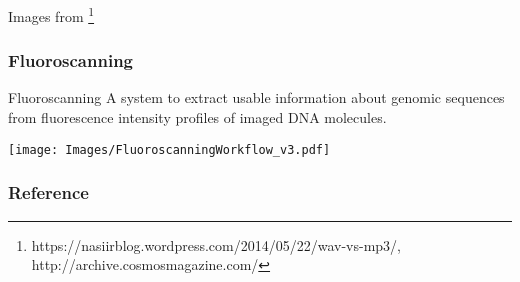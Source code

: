 \documentclass[10pt,dvipsnames,table]{beamer}
\begin{document}
\begin{frame}
\begin{columns}[t]
\begin{column}{0.5\textwidth}
\end{column}
\end{columns}
{\tiny{Images from \footnote{\tiny{https://nasiirblog.wordpress.com/2014/05/22/wav-vs-mp3/, http://archive.cosmosmagazine.com/}} }}
\end{frame}

\begin{frame}
\frametitle{Fluoroscanning}
\begin{block}{Fluoroscanning}
A system to extract usable information about genomic sequences from fluorescence intensity profiles of imaged DNA molecules. 
\end{block}
\end{frame}

\begin{frame}
\texttt{[image: Images/FluoroscanningWorkflow\_v3.pdf]}
\end{frame}

\begin{frame}
\frametitle{Reference}
{\footnotesize{
    
    
}}
\end{frame}
\end{document}

